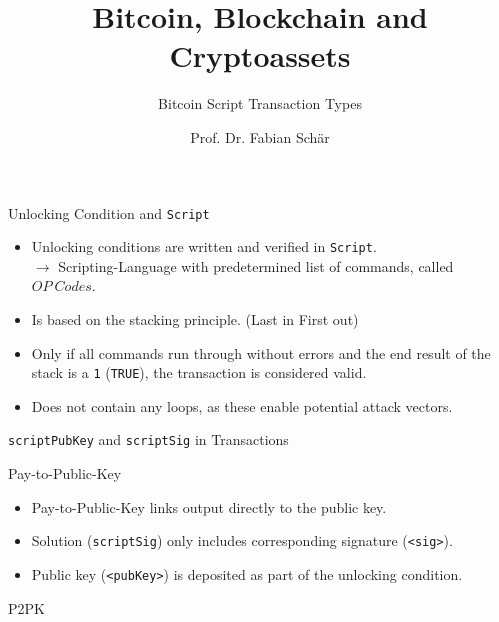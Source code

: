 \documentclass[]{beamer}
\title{Bitcoin, Blockchain and Cryptoassets}
\subtitle{Bitcoin Script Transaction Types}
\author{Prof. Dr. Fabian Schär}
\institute{University of Basel}
\begin{document}
\thispagestyle{empty}
\begin{frame}[noframenumbering]
	\titlepage
\end{frame}


\begin{frame}{Unlocking Condition and \texttt{Script}}
\begin{itemize}
	\item Unlocking conditions are written and verified in \texttt{Script}.\\
	 $\rightarrow$ Scripting-Language with predetermined list of commands, called $OP\ Codes$.
	 \item Is based on the stacking principle. (Last in First out)
	 \item Only if all commands run through without errors and the end result of the stack is a \texttt{1} (\texttt{TRUE}), the transaction is considered valid.
	 \item Does not contain any loops, as these enable potential attack vectors.
\end{itemize}
\end{frame}


\begin{frame}{\texttt{scriptPubKey} and \texttt{scriptSig} in Transactions}
\begin{figure}
	
\end{figure}
\end{frame}


\begin{frame}{Pay-to-Public-Key}
\vspace{1em}
\begin{itemize}
	\item{Pay-to-Public-Key links output directly to the public key.}
	\item{Solution (\texttt{scriptSig}) only includes corresponding signature (\texttt{<sig>}).}
	\item{Public key (\texttt{<pubKey>}) is deposited as part of the unlocking condition.}
\end{itemize}
\end{frame}


\begin{frame}{P2PK}
\begin{figure}
\centering

\end{figure}
\end{frame}
\end{document}
